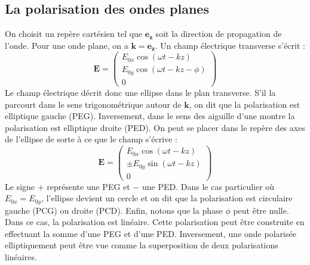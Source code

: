 \subsection{La polarisation des ondes planes}
\label{sec:circpolar}
On choisit un repère cartésien tel que $\bm{e_z}$ soit la direction de propagation de l'onde. Pour une onde plane, on a $\bm{k}=\bm{e_z}$. Un champ électrique transverse s'écrit :
\begin{equation}
\bm{E}=\begin{pmatrix}
E_{0x}\cos{(\omega t-kz)}\\
E_{0y}\cos{(\omega t-kz-\phi)}\\
0
\end{pmatrix}
\end{equation}
Le champ électrique décrit donc une ellipse dans le plan transverse. S'il la parcourt dans le sens trigonométrique autour de $\bm{k}$, on dit que la polarisation est elliptique gauche (PEG). Inversement, dans le sens des aiguille d'une montre la polarisation est elliptique droite (PED). On peut se placer dans le repère des axes de l'ellipse de sorte à ce que le champ s'écrive :
\begin{equation}
\bm{E}=\begin{pmatrix}
E_{0x}\cos{(\omega t-kz)}\\
\pm E_{0y}\sin{(\omega t-kz)}\\
0
\end{pmatrix}
\end{equation}
Le signe $+$ représente une PEG et $-$ une PED. Dans le cas particulier où $E_{0x}=E_{0y}$, l'ellipse devient un cercle et on dit que la polarisation est circulaire gauche (PCG) ou droite (PCD). Enfin, notons que la phase $\phi$ peut être nulle. Dans ce cas, la polarisation est linéaire. Cette polarisation peut être construite en effectuant la somme d'une PEG et d'une PED. Inversement, une onde polarisée elliptiquement peut être vue comme la superposition de deux polarisations linéaires.


